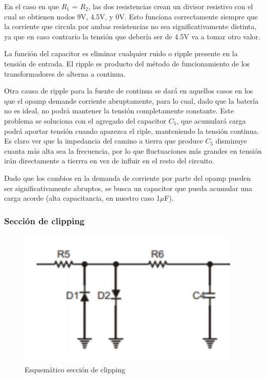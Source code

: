 \documentclass[../../main.tex]{subfiles}
\begin{document}
En el caso en que $R_1$ = $R_2$, las dos resistencias crean un divisor resistivo con el cual se obtienen nodos 9V, 4.5V, y 0V. Esto funciona correctamente siempre que la corriente que circula por ambas resistencias no sea significativamente distinta, ya que en caso contrario la tensión que debería ser de 4.5V va a tomar otro valor. \par
La función del capacitor es eliminar cualquier ruido o ripple presente en la tensi\'on de entrada. El ripple es producto del m\'etodo de funcionamiento de los transformadores de alterna a continua. \par
Otra causa de ripple para la fuente de continua se dará en aquellos casos en los que el opamp demande corriente abruptamente, para lo cual, dado que la batería no es ideal, no podrá mantener la tensión completamente constante. Este problema se soluciona con el agregado del capacitor $C_5$, que acumulará carga podrá aportar tensión cuando aparezca el riple, manteniendo la tensión continua. Es claro ver que la impedancia del camino a tierra que produce $C_5$ disminuye cuanta más alta sea la frecuencia, por lo que fluctuaciones más grandes en tensión irán directamente a tierrra en vez de influir en el resto del circuito.\par
Dado que los cambios en la demanda de corriente por parte del opamp pueden ser significativamente abruptos, se busca un capacitor que pueda acumular una carga acorde (alta capacitancia, en nuestro caso 1$\mu$F). 

\subsubsection{Secci\'on de clipping}

\begin{figure}[H]	%
	\centering
	\includegraphics[scale=1]{imagenes/esquematico_clipping.png}
	\caption{Esquem\'atico secci\'on de clipping}
	\label{fig:ej5_esquematico_clipping}
\end{figure}
\end{document}
